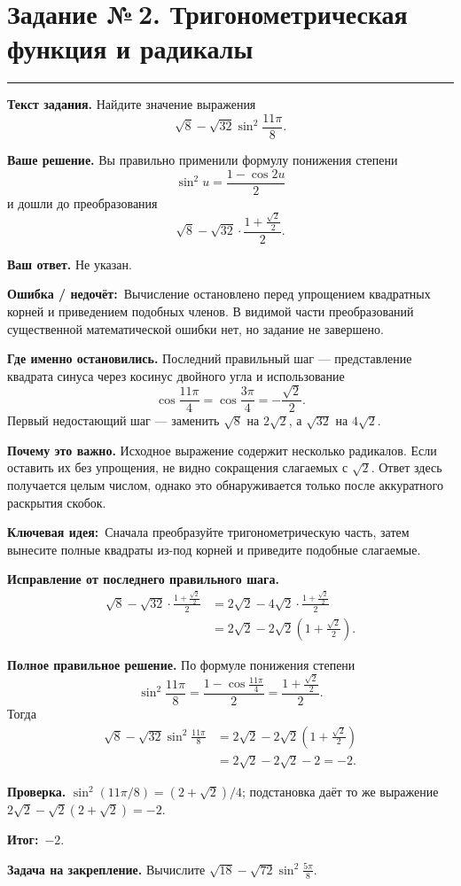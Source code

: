 \documentclass[a4paper,11pt]{article}
\newcommand{\rlabel}[1]{\par\noindent\textbf{\color{darkaccent}#1}\quad}
\newcommand{\errorlabel}{\textcolor{err}{\textbf{Ошибка / недочёт:}}}
\newcommand{\keylabel}{\textcolor{blue!60!black}{\textbf{Ключевая идея:}}}
\newcommand{\finallabel}{\textcolor{teal!60!black}{\textbf{Итог:}}}
\newcommand{\tasktitle}[2]{\clearpage\phantomsection\label{task:#1}\section*{Задание №\,#1. #2}\vspace{-3mm}\textcolor{accent}{\rule{\linewidth}{0.45pt}}}
\begin{document}
\tasktitle{2}{Тригонометрическая функция и радикалы}
\rlabel{Текст задания.} Найдите значение выражения
\[
\sqrt8-\sqrt{32}\sin^2\!\frac{11\pi}{8}.
\]
\rlabel{Ваше решение.} Вы правильно применили формулу понижения степени
\[
\sin^2u=\frac{1-\cos2u}{2}
\]
и дошли до преобразования
\[
\sqrt8-\sqrt{32}\cdot\frac{1+\frac{\sqrt2}{2}}{2}.
\]
\rlabel{Ваш ответ.} Не указан.
\par\noindent\errorlabel\ Вычисление остановлено перед упрощением квадратных корней и приведением подобных членов. В видимой части преобразований существенной математической ошибки нет, но задание не завершено.
\rlabel{Где именно остановились.} Последний правильный шаг --- представление квадрата синуса через косинус двойного угла и использование
\[
\cos\frac{11\pi}{4}=\cos\frac{3\pi}{4}=-\frac{\sqrt2}{2}.
\]
Первый недостающий шаг --- заменить $\sqrt8$ на $2\sqrt2$, а $\sqrt{32}$ на $4\sqrt2$.
\rlabel{Почему это важно.} Исходное выражение содержит несколько радикалов. Если оставить их без упрощения, не видно сокращения слагаемых с $\sqrt2$. Ответ здесь получается целым числом, однако это обнаруживается только после аккуратного раскрытия скобок.
\par\noindent\keylabel\ Сначала преобразуйте тригонометрическую часть, затем вынесите полные квадраты из-под корней и приведите подобные слагаемые.
\rlabel{Исправление от последнего правильного шага.}
\[
\begin{aligned}
\sqrt8-\sqrt{32}\cdot\frac{1+\frac{\sqrt2}{2}}2
&=2\sqrt2-4\sqrt2\cdot\frac{1+\frac{\sqrt2}{2}}2\\
&=2\sqrt2-2\sqrt2\left(1+\frac{\sqrt2}{2}\right).
\end{aligned}
\]
\rlabel{Полное правильное решение.} По формуле понижения степени
\[
\sin^2\frac{11\pi}{8}
=\frac{1-\cos\frac{11\pi}{4}}2
=\frac{1+\frac{\sqrt2}{2}}2.
\]
Тогда
\[
\begin{aligned}
\sqrt8-\sqrt{32}\sin^2\frac{11\pi}{8}
&=2\sqrt2-2\sqrt2\left(1+\frac{\sqrt2}{2}\right)\\
&=2\sqrt2-2\sqrt2-2=-2.
\end{aligned}
\]
\rlabel{Проверка.} $\sin^2(11\pi/8)=(2+\sqrt2)/4$; подстановка даёт то же выражение $2\sqrt2-\sqrt2(2+\sqrt2)=-2$.
\par\noindent\finallabel\ $\boxed{-2}$.
\rlabel{Задача на закрепление.} Вычислите $\displaystyle\sqrt{18}-\sqrt{72}\sin^2\frac{5\pi}{8}$.
\end{document}
